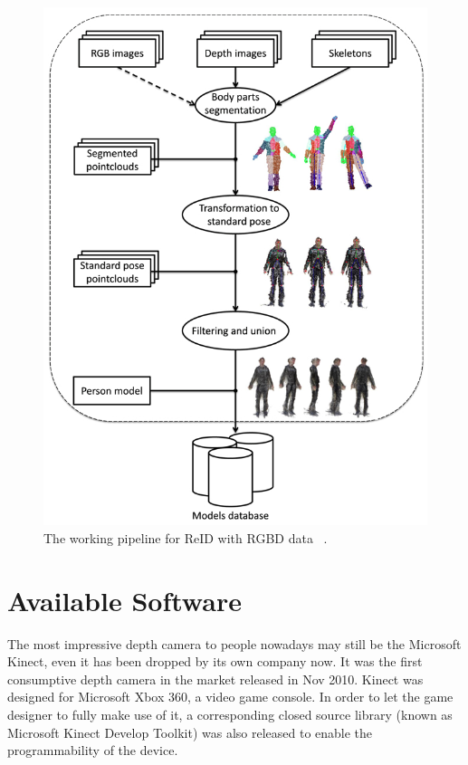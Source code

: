 \begin{figure}
    \begin{center}
        \includegraphics[scale=0.4]{figures/rgbd_for_reid.png}
        \caption{The working pipeline for ReID with RGBD data ~\protect \cite{rgbd-for-reid}.}
        \label{fig:rgbd-pipeline}
    \end{center}
\end{figure}

\section{Available Software}
\label{sec:related_work_framework}

The most impressive depth camera to people nowadays may still be the Microsoft Kinect, even it has been dropped
by its own company now. It was the first consumptive depth camera in the market released in Nov 2010. Kinect was
designed for Microsoft Xbox 360, a video game console. In order to let the game designer to fully make use of it,
a corresponding closed source library (known as Microsoft Kinect Develop Toolkit) was also released to enable
the programmability of the device.

